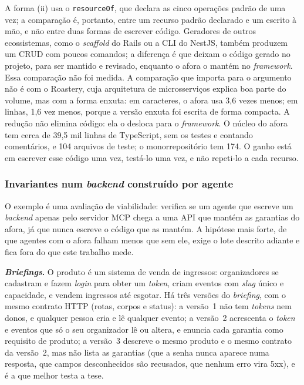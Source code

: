 \documentclass[a4paper,12pt]{article}
\newcommand{\estr}[1]{\textit{#1}}
\begin{document}
A forma (ii) usa o \texttt{resourceOf}, que declara as cinco operações padrão de uma vez; a comparação é, portanto, entre um recurso padrão declarado e um escrito à mão, e não entre duas formas de escrever código. Geradores de outros ecossistemas, como o \estr{scaffold} do Rails ou a CLI do NestJS, também produzem um CRUD com poucos comandos; a diferença é que deixam o código gerado no projeto, para ser mantido e revisado, enquanto o afora o mantém no \estr{framework}. Essa comparação não foi medida. A comparação que importa para o argumento não é com o Roastery, cuja arquitetura de microsserviços explica boa parte do volume, mas com a forma enxuta: em caracteres, o afora usa 3,6 vezes menos; em linhas, 1,6 vez menos, porque a versão enxuta foi escrita de forma compacta. A redução não elimina código: ela o desloca para o \estr{framework}. O núcleo do afora tem cerca de 39,5 mil linhas de TypeScript, sem os testes e contando comentários, e 104 arquivos de teste; o monorrepositório tem 174. O ganho está em escrever esse código uma vez, testá-lo uma vez, e não repeti-lo a cada recurso.

\subsubsection{Invariantes num \textit{backend} construído por agente}\label{sec:invariantes}

O exemplo  é uma avaliação de viabilidade: verifica se um agente que escreve um \estr{backend} apenas pelo servidor MCP chega a uma API que mantém as garantias do afora, já que nunca escreve o código que as mantém. A hipótese mais forte, de que agentes com o afora falham menos que sem ele, exige o lote descrito adiante e fica fora do que este trabalho mede.

\textbf{\textit{Briefings}.} O produto é um sistema de venda de ingressos: organizadores se cadastram e fazem \estr{login} para obter um \estr{token}, criam eventos com \estr{slug} único e capacidade, e vendem ingressos até esgotar. Há três versões do \estr{briefing}, com o mesmo contrato HTTP (rotas, corpos e status): a versão~1 não tem \estr{tokens} nem donos, e qualquer pessoa cria e lê qualquer evento; a versão~2 acrescenta o \estr{token} e eventos que só o seu organizador lê ou altera, e enuncia cada garantia como requisito de produto; a versão~3 descreve o mesmo produto e o mesmo contrato da versão~2, mas não lista as garantias (que a senha nunca aparece numa resposta, que campos desconhecidos são recusados, que nenhum erro vira 5xx), e é a que melhor testa a tese.
\end{document}
